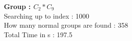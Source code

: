 \textbf{Group : $C_2*C_9$}\\
Searching up to index : 1000\\
How many normal groups are found : 358\\
Total Time in s : 197.5\\
